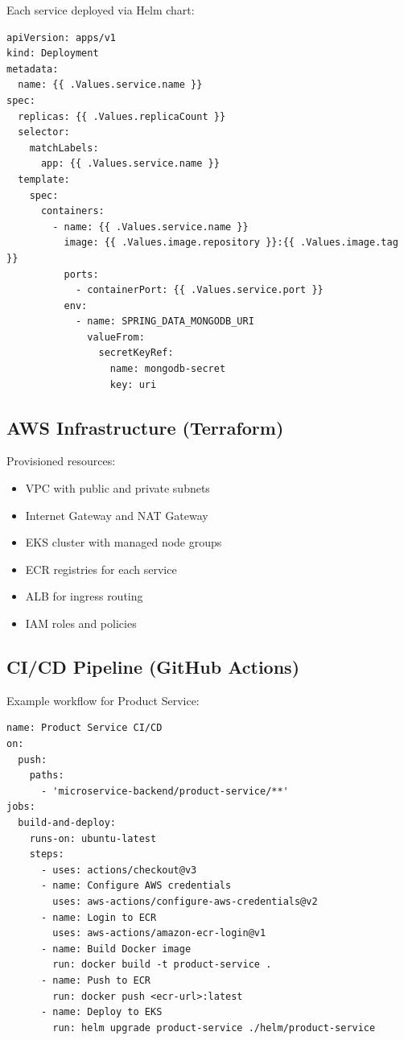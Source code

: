 Each service deployed via Helm chart:

\begin{verbatim}
apiVersion: apps/v1
kind: Deployment
metadata:
  name: {{ .Values.service.name }}
spec:
  replicas: {{ .Values.replicaCount }}
  selector:
    matchLabels:
      app: {{ .Values.service.name }}
  template:
    spec:
      containers:
        - name: {{ .Values.service.name }}
          image: {{ .Values.image.repository }}:{{ .Values.image.tag }}
          ports:
            - containerPort: {{ .Values.service.port }}
          env:
            - name: SPRING_DATA_MONGODB_URI
              valueFrom:
                secretKeyRef:
                  name: mongodb-secret
                  key: uri
\end{verbatim}

\subsection{AWS Infrastructure (Terraform)}

Provisioned resources:
\begin{itemize}
    \item VPC with public and private subnets
    \item Internet Gateway and NAT Gateway
    \item EKS cluster with managed node groups
    \item ECR registries for each service
    \item ALB for ingress routing
    \item IAM roles and policies
\end{itemize}

\subsection{CI/CD Pipeline (GitHub Actions)}

Example workflow for Product Service:

\begin{verbatim}
name: Product Service CI/CD
on:
  push:
    paths:
      - 'microservice-backend/product-service/**'
jobs:
  build-and-deploy:
    runs-on: ubuntu-latest
    steps:
      - uses: actions/checkout@v3
      - name: Configure AWS credentials
        uses: aws-actions/configure-aws-credentials@v2
      - name: Login to ECR
        uses: aws-actions/amazon-ecr-login@v1
      - name: Build Docker image
        run: docker build -t product-service .
      - name: Push to ECR
        run: docker push <ecr-url>:latest
      - name: Deploy to EKS
        run: helm upgrade product-service ./helm/product-service
\end{verbatim}

